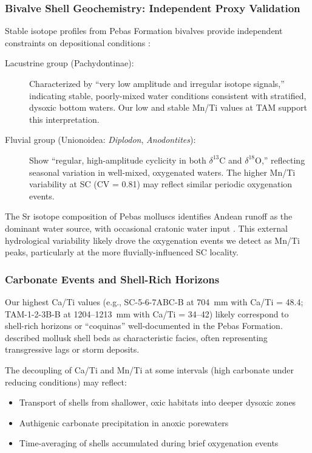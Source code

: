 \subsubsection{Bivalve Shell Geochemistry: Independent Proxy Validation}

Stable isotope profiles from Pebas Formation bivalves provide independent constraints on depositional conditions \citep{Kaandorp2005}:

\begin{description}
\item[Lacustrine group (Pachydontinae):] Characterized by ``very low amplitude and irregular isotope signals,'' indicating stable, poorly-mixed water conditions consistent with stratified, dysoxic bottom waters. Our low and stable Mn/Ti values at TAM support this interpretation.

\item[Fluvial group (Unionoidea: \textit{Diplodon}, \textit{Anodontites}):] Show ``regular, high-amplitude cyclicity in both $\delta^{13}$C and $\delta^{18}$O,'' reflecting seasonal variation in well-mixed, oxygenated waters. The higher Mn/Ti variability at SC (CV = 0.81) may reflect similar periodic oxygenation events.
\end{description}

The Sr isotope composition of Pebas molluscs identifies Andean runoff as the dominant water source, with occasional cratonic water input \citep{Kaandorp2005}. This external hydrological variability likely drove the oxygenation events we detect as Mn/Ti peaks, particularly at the more fluvially-influenced SC locality.

\subsubsection{Carbonate Events and Shell-Rich Horizons}

Our highest Ca/Ti values (e.g., SC-5-6-7ABC-B at 704~mm with Ca/Ti = 48.4; TAM-1-2-3B-B at 1204--1213~mm with Ca/Ti = 34--42) likely correspond to shell-rich horizons or ``coquinas'' well-documented in the Pebas Formation. \citet{Wesselingh2002} described mollusk shell beds as characteristic facies, often representing transgressive lags or storm deposits.

The decoupling of Ca/Ti and Mn/Ti at some intervals (high carbonate under reducing conditions) may reflect:
\begin{itemize}
\item Transport of shells from shallower, oxic habitats into deeper dysoxic zones
\item Authigenic carbonate precipitation in anoxic porewaters
\item Time-averaging of shells accumulated during brief oxygenation events
\end{itemize}

